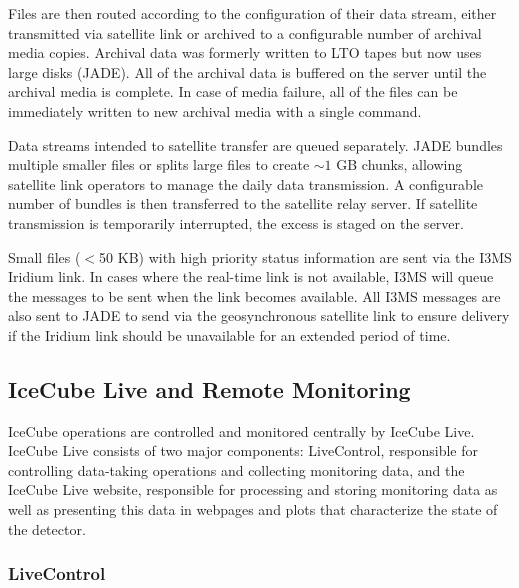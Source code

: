Files are then routed according to the configuration of their
data stream, either transmitted via satellite link or 
archived to a configurable number of archival media copies.  Archival data
was formerly written to LTO tapes but now uses large disks (JADE).
All of the archival data is buffered on the server until the archival media
is complete. In case of media failure, all of the files can be 
immediately written to new archival media with a single command.

Data streams intended to satellite transfer are queued separately.  
JADE bundles multiple smaller files or splits large files to create $\sim1$
GB chunks, allowing satellite link operators to manage the daily data
transmission.  A configurable number of bundles is then transferred to the
satellite relay server.  If satellite transmission is temporarily
interrupted, the excess is staged on the server. 

Small files ($<$50 KB) with high priority status information are sent via
the I3MS Iridium link.  In cases where the real-time link is not available, I3MS
will queue the messages to be sent when the link becomes available. All
I3MS messages are also sent to JADE to send via the geosynchronous satellite link to
ensure delivery if the Iridium link should be unavailable for an extended
period of time.

\subsection{\label{sec:online:icecubelive}IceCube Live and Remote Monitoring}

IceCube operations are controlled and monitored centrally by IceCube Live.
IceCube Live consists of two major components: LiveControl,
responsible for controlling data-taking operations and collecting
monitoring data, and the IceCube Live website, responsible for processing
and storing monitoring data as well as presenting this data in webpages and
plots that characterize the state of the detector.

\subsubsection{LiveControl}

